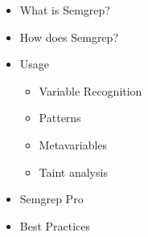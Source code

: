 \documentclass[preview]{standalone}
\begin{document}
\begin{center}
\begin{itemize}
                      \item What is Semgrep?
                      \item How does Semgrep?
                      \item Usage
                      \begin{itemize}
                      \item Variable Recognition
                      \item Patterns
                      \item Metavariables
                      \item Taint analysis
                      \end{itemize}
                      \item Semgrep Pro
                      \item Best Practices
                      \end{itemize}
\end{center}
\end{document}
